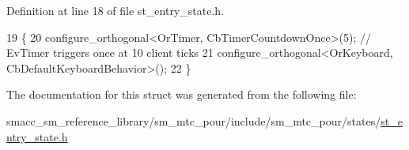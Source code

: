 Definition at line 18 of file st\+\_\+entry\+\_\+state.\+h.


\begin{DoxyCode}
19     \{
20         configure\_orthogonal<OrTimer, CbTimerCountdownOnce>(5); \textcolor{comment}{// EvTimer triggers once at 10 client ticks}
21         configure\_orthogonal<OrKeyboard, CbDefaultKeyboardBehavior>();
22     \}
\end{DoxyCode}


The documentation for this struct was generated from the following file\+:\begin{DoxyCompactItemize}
\item 
smacc\+\_\+sm\+\_\+reference\+\_\+library/sm\+\_\+mtc\+\_\+pour/include/sm\+\_\+mtc\+\_\+pour/states/\hyperlink{sm__mtc__pour_2include_2sm__mtc__pour_2states_2st__entry__state_8h}{st\+\_\+entry\+\_\+state.\+h}\end{DoxyCompactItemize}

